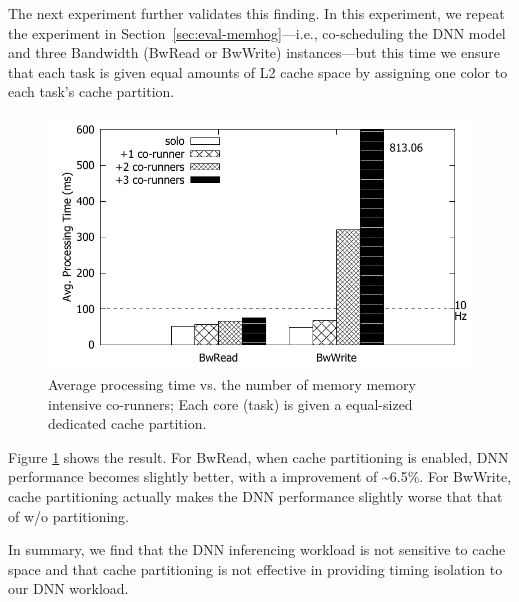 The next experiment further validates this finding. In this
experiment, we repeat the experiment in
Section~\ref{sec:eval-memhog}---i.e., co-scheduling the DNN model and
three Bandwidth (BwRead or BwWrite) instances---but this time we
ensure that each task is given equal amounts of L2 cache space by
assigning one color to each task's cache partition.

\begin{figure}[h]
  \centering
  \includegraphics[width=.45\textwidth]{figs/palloc_bandwidth_exectime}
  \caption{Average processing time vs. the number of memory
memory intensive co-runners; Each core (task) is given a equal-sized
dedicated cache partition.}
  \label{fig:palloc_bandwidth_exectime}
\end{figure}

Figure \ref{fig:palloc_bandwidth_exectime} shows the
result. For BwRead, when cache partitioning is enabled, DNN
performance becomes slightly better, with a improvement of  
\textasciitilde6.5\%. For BwWrite, cache partitioning actually makes
the DNN performance slightly worse that that of w/o partitioning.

In summary, we find that the DNN inferencing workload is not sensitive
to cache space and that cache partitioning is not effective in
providing timing isolation to our DNN workload.



